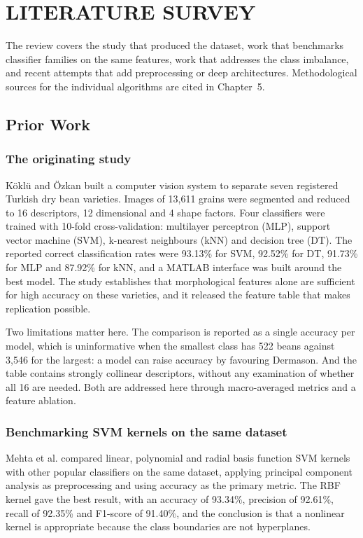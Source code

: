 \chapter{LITERATURE SURVEY}

The review covers the study that produced the dataset, work that benchmarks
classifier families on the same features, work that addresses the class
imbalance, and recent attempts that add preprocessing or deep architectures.
Methodological sources for the individual algorithms are cited in Chapter~5.

\section{Prior Work}

\subsection{The originating study}

Köklü and Özkan \cite{koklu2020} built a computer vision system to separate seven
registered Turkish dry bean varieties. Images of 13,611 grains were segmented and
reduced to 16 descriptors, 12 dimensional and 4 shape factors. Four classifiers
were trained with 10-fold cross-validation: multilayer perceptron (MLP), support
vector machine (SVM), k-nearest neighbours (kNN) and decision tree (DT). The
reported correct classification rates were 93.13\% for SVM, 92.52\% for DT,
91.73\% for MLP and 87.92\% for kNN, and a MATLAB interface was built around the
best model. The study establishes that morphological features alone are sufficient
for high accuracy on these varieties, and it released the feature table that makes
replication possible.

Two limitations matter here. The comparison is reported as a single accuracy per
model, which is uninformative when the smallest class has 522 beans against 3,546
for the largest: a model can raise accuracy by favouring Dermason. And the table
contains strongly collinear descriptors, without any examination of whether all 16
are needed. Both are addressed here through macro-averaged metrics and a feature
ablation.

\subsection{Benchmarking SVM kernels on the same dataset}

Mehta et al. \cite{mehta2023} compared linear, polynomial and radial basis function
SVM kernels with other popular classifiers on the same dataset, applying principal
component analysis as preprocessing and using accuracy as the primary metric. The
RBF kernel gave the best result, with an accuracy of 93.34\%, precision of 92.61\%,
recall of 92.35\% and F1-score of 91.40\%, and the conclusion is that a nonlinear
kernel is appropriate because the class boundaries are not hyperplanes.

